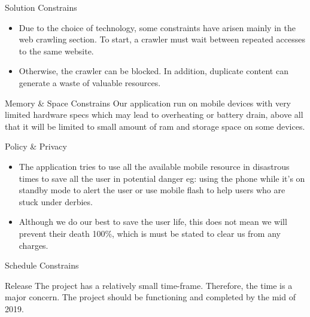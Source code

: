 \documentclass{beamer}
\begin{document}
\begin{frame}{Solution Constrains}

\begin{itemize}
    \item<1-> Due to the choice of technology, some constraints have arisen mainly in the web crawling section.  To start, a crawler must wait between repeated accesses to the same website. 

    \item<2-> Otherwise,  the crawler can be blocked.  In addition,  duplicate content can generate a waste of valuable resources.
\end{itemize}
\end{frame}



\begin{frame}{Memory \& Space Constrains}
Our application run on mobile devices with very limited hardware specs which may lead to overheating or battery drain, above all that it will be limited to small amount of ram and storage space on some devices. 

\end{frame}

\begin{frame}{Policy \& Privacy}

\begin{itemize}
    \item<1-> The application tries to use all the available mobile resource in disastrous times to save all the user in potential danger eg: using the phone while it's on standby mode to alert the user or use mobile flash to help users who are stuck under derbies.
    
    \item<2-> Although we do our best to save the user life, this does not mean we will prevent their death 100\%, which is must be stated to clear us from any charges.
\end{itemize}    
\end{frame}

\begin{frame}{Schedule Constrains}
\begin{exampleblock}{Release}
    The project has a relatively small time-frame. Therefore, the time is a major concern. \linebreak The project should be functioning and completed by the mid of 2019.
    \end{exampleblock}
\end{frame}
\end{document}
